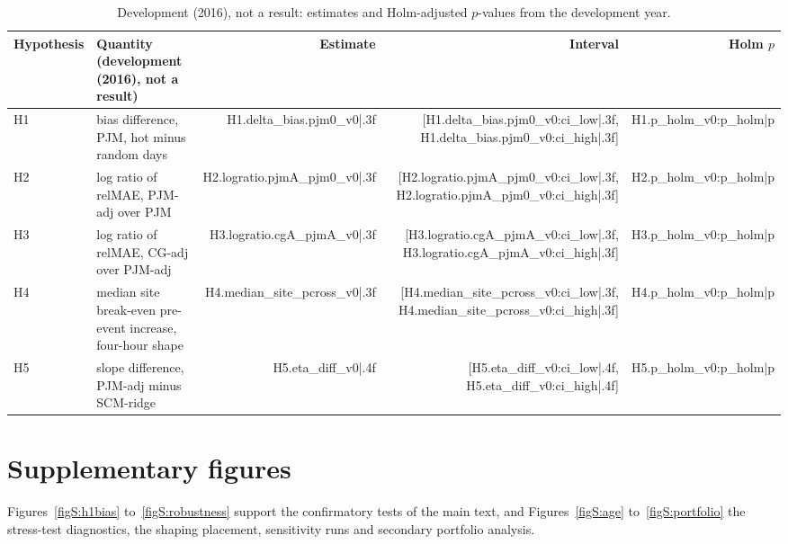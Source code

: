 \begin{table}[htbp]
\centering
\caption{Development (2016), not a result: estimates and Holm-adjusted $p$-values from the development year.}\label{tabS:dev}
\footnotesize
\begin{tabular}{@{}l>{\raggedright\arraybackslash}p{6.2cm}rrr@{}}
\toprule
Hypothesis & Quantity (development (2016), not a result) & Estimate & Interval & Holm $p$ \\
\midrule
H1 & bias difference, PJM, hot minus random days & {{H1.delta_bias.pjm0_v0|.3f}} & [{{H1.delta_bias.pjm0_v0:ci_low|.3f}}, {{H1.delta_bias.pjm0_v0:ci_high|.3f}}] & {{H1.p_holm_v0:p_holm|p}} \\
H2 & log ratio of relMAE, PJM-adj over PJM & {{H2.logratio.pjmA_pjm0_v0|.3f}} & [{{H2.logratio.pjmA_pjm0_v0:ci_low|.3f}}, {{H2.logratio.pjmA_pjm0_v0:ci_high|.3f}}] & {{H2.p_holm_v0:p_holm|p}} \\
H3 & log ratio of relMAE, CG-adj over PJM-adj & {{H3.logratio.cgA_pjmA_v0|.3f}} & [{{H3.logratio.cgA_pjmA_v0:ci_low|.3f}}, {{H3.logratio.cgA_pjmA_v0:ci_high|.3f}}] & {{H3.p_holm_v0:p_holm|p}} \\
H4 & median site break-even pre-event increase, four-hour shape & {{H4.median_site_pcross_v0|.3f}} & [{{H4.median_site_pcross_v0:ci_low|.3f}}, {{H4.median_site_pcross_v0:ci_high|.3f}}] & {{H4.p_holm_v0:p_holm|p}} \\
H5 & slope difference, PJM-adj minus SCM-ridge & {{H5.eta_diff_v0|.4f}} & [{{H5.eta_diff_v0:ci_low|.4f}}, {{H5.eta_diff_v0:ci_high|.4f}}] & {{H5.p_holm_v0:p_holm|p}} \\
\bottomrule
\end{tabular}
\par{}
\end{table}

\clearpage
\section{Supplementary figures}\label{sec:S2}

Figures~\ref{figS:h1bias} to~\ref{figS:robustness} support the confirmatory tests of the main text, and Figures~\ref{figS:age} to~\ref{figS:portfolio} the stress-test diagnostics, the shaping placement, sensitivity runs and secondary portfolio analysis.

